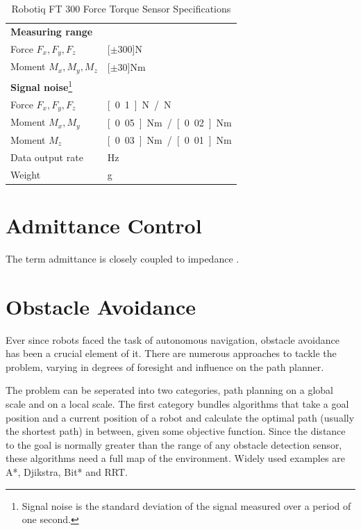 \begin{savenotes}
\begin{table}[h]
\begin{center}
 \caption{Robotiq FT 300 Force Torque Sensor Specifications}\vspace{1ex}
 \label{tab:robotiq_ft}
 \begin{tabular}{ll}
 \hline
 \textbf{Measuring range} & \\
 Force $F_x, F_y, F_z$ & \unit[$\pm 300$]{N} \\
 Moment $M_x, M_y, M_z$ & \unit[$\pm 30$]{Nm} \\ \hline
 \textbf{Signal noise}\footnote{Signal noise is the standard deviation of the signal measured over a period of one second.} &\\
 Force $F_x, F_y, F_z$ & \unit[0.1]{N} / \unit[1]{N} \\
 Moment $M_x, M_y$ & \unit[0.05]{Nm} / \unit[0.02]{Nm} \\
 Moment $M_z$ & \unit[0.03]{Nm} / \unit[0.01]{Nm} \\ \hline
 Data output rate & \unit[100]{Hz} \\
 Weight & \unit[300]{g}\\
 \hline
 \end{tabular}
\end{center}
\end{table}
\end{savenotes}


\chapter{Admittance Control}
The term admittance is closely coupled to impedance \citep{hogan1985impedance}.


\chapter{Obstacle Avoidance}
Ever since robots faced the task of autonomous navigation, obstacle avoidance has been a crucial element of it. There are numerous approaches to tackle the problem, varying in degrees of foresight and influence on the path planner.

The problem can be seperated into two categories, path planning on a global scale and on a local scale. The first category bundles algorithms that take a goal position and a current position of a robot and calculate the optimal path (usually the shortest path) in between, given some objective function. Since the distance to the goal is normally greater than the range of any obstacle detection sensor, these algorithms need a full map of the environment. Widely used examples are A*, Djikstra, Bit* and RRT.

